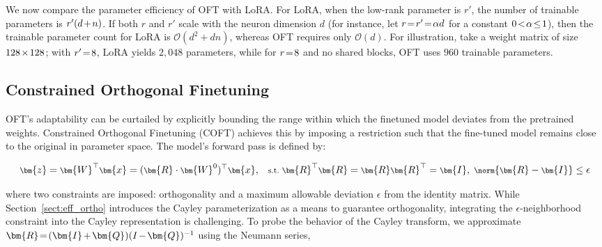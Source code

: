 We now compare the parameter efficiency of OFT with LoRA. For LoRA, when the low-rank parameter is $r'$, the number of trainable parameters is $\thickmuskip=2mu \medmuskip=2mu r'(d+n)$. If both $r$ and $r'$ scale with the neuron dimension $d$ (for instance, let $\thickmuskip=2mu \medmuskip=2mu r=r'=\alpha d$ for a constant $\thickmuskip=2mu \medmuskip=2mu 0<\alpha\leq 1$), then the trainable parameter count for LoRA is $\mathcal{O}(d^2+dn)$, whereas OFT requires only $\mathcal{O}(d)$. For illustration, take a weight matrix of size $\thickmuskip=2mu \medmuskip=2mu 128\times 128$; with $\thickmuskip=2mu \medmuskip=2mu r'=8$, LoRA yields $2,048$ parameters, while for $\thickmuskip=2mu \medmuskip=2mu r=8$ and no shared blocks, OFT uses $960$ trainable parameters.

\subsection{Constrained Orthogonal Finetuning}

OFT’s adaptability can be curtailed by explicitly bounding the range within which the finetuned model deviates from the pretrained weights. Constrained Orthogonal Finetuning (COFT) achieves this by imposing a restriction such that the fine-tuned model remains close to the original in parameter space. The model’s forward pass is defined by:

\begin{equation}\label{eq:coft_general}
    \footnotesize
    \bm{z}=\bm{W}^\top\bm{x}=(\bm{R}\cdot\bm{W}^0)^\top\bm{x},~~~\text{s.t.}~\bm{R}^\top\bm{R}=\bm{R}\bm{R}^\top=\bm{I},~\norm{\bm{R}-\bm{I}}\leq \epsilon
\end{equation}

where two constraints are imposed: orthogonality and a maximum allowable deviation $\epsilon$ from the identity matrix. While Section~\ref{sect:eff_ortho} introduces the Cayley parameterization as a means to guarantee orthogonality, integrating the $\epsilon$-neighborhood constraint into the Cayley representation is challenging. To probe the behavior of the Cayley transform, we approximate $\thickmuskip=2mu \medmuskip=2mu \bm{R}=(\bm{I}+\bm{Q})(I-\bm{Q})^{-1}$ using the Neumann series,

